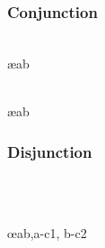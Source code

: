 
\begin{multicols}{2}
\subsubsection*{Conjunction}

\begin{pf}
	 
\end{pf}

\vfill\null
\columnbreak

\begin{pf}
\\	 \ae{ab}

\\	 \ae{ab}
\end{pf}
\end{multicols} %

\vspace{-10pt}
\hrulefill
\vspace{-10pt}
\begin{multicols}{2}
\subsubsection*{Disjunction}

\begin{pf}

\\	
\end{pf}

\vfill\null
\columnbreak

\begin{pf}
\\	\open
		\ellipsesline
	\close
	\open
		\ellipsesline
	\close
	 \oe{ab,a-c1, b-c2}
\end{pf}
%

\end{multicols} %


